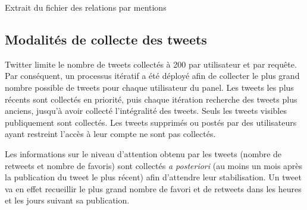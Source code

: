 \begin{encadre}
    \caption{Extrait du fichier des relations par mentions}
    \label{encadre:mentions}

    \noindent{}
\end{encadre}

\subsection{Modalités de collecte des tweets}

Twitter limite le nombre de tweets collectés à 200 par utilisateur et par requête. Par conséquent, un processus itératif a été déployé afin de collecter le plus grand nombre possible de tweets pour chaque utilisateur du panel. Les tweets les plus récents sont collectés en priorité, puis chaque itération recherche des tweets plus anciens, jusqu’à avoir collecté l’intégralité des tweets. Seuls les tweets visibles publiquement sont collectés. Les tweets supprimés ou postés par des utilisateurs ayant restreint l’accès à leur compte ne sont pas collectés.

Les informations sur le niveau d’attention obtenu par les tweets (nombre de retweets et nombre de favoris) sont collectés \textit{a posteriori} (au moins un mois après la publication du tweet le plus récent) afin d’attendre leur stabilisation. Un tweet va en effet recueillir le plus grand nombre de favori et de retweets  dans les heures et les jours suivant sa publication.


